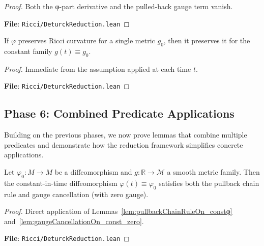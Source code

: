 \begin{proof}
Both the φ-part derivative and the pulled-back gauge term vanish.

\textbf{File}: \texttt{Ricci/DeturckReduction.lean}
\end{proof}

\begin{lemma}
\label{lem:ricciNaturalityOn_const_single}
\leanok
{}
If $\varphi$ preserves Ricci curvature for a single metric $g_0$, then it preserves it for the constant family $g(t) \equiv g_0$.
\end{lemma}

\begin{proof}
\leanok
{}
Immediate from the assumption applied at each time $t$.

\textbf{File}: \texttt{Ricci/DeturckReduction.lean}
\end{proof}


\subsection{Phase 6: Combined Predicate Applications}

Building on the previous phases, we now prove lemmas that combine multiple predicates and demonstrate how the reduction framework simplifies concrete applications.

\begin{lemma}
\label{lem:const_diff_satisfies_chain_and_gauge}
\leanok
Let $\varphi_0 : M \to M$ be a diffeomorphism and $g : \mathbb{R} \to \mathcal{M}$ a smooth metric family. Then the constant-in-time diffeomorphism $\varphi(t) \equiv \varphi_0$ satisfies both the pullback chain rule and gauge cancellation (with zero gauge).
\end{lemma}

\begin{proof}
\leanok
{}
Direct application of Lemmas~\ref{lem:pullbackChainRuleOn_constφ} and~\ref{lem:gaugeCancellationOn_const_zero}.

\textbf{File}: \texttt{Ricci/DeturckReduction.lean}
\end{proof}

